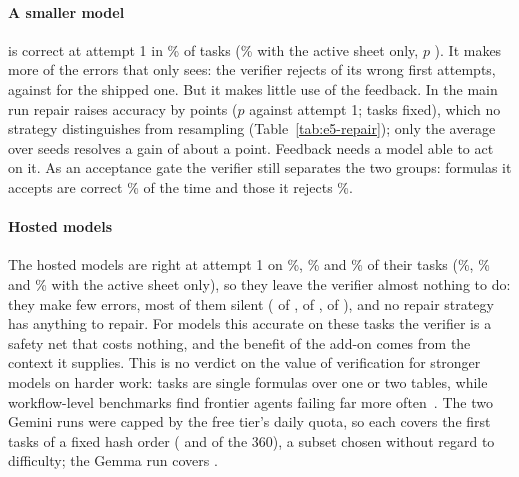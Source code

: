 \paragraph{A smaller model}
\efBName{} is correct at attempt 1 in \efBfinal\% of tasks (\efBflat\% with the active sheet only, $p$ \efBTestfinalvsflatP). It makes more of the errors that only \gc{} sees: the verifier rejects \efBCaughtTwo{} of its \efBWrong{} wrong first attempts, against \efBCaughtOne{} for the shipped one. But it makes little use of the feedback. In the main run repair raises accuracy by \efBSvtwofbD{} points ($p$ \efBSvtwofbP{} against attempt 1; \efBSvtwofbFixed{} tasks fixed), which no strategy distinguishes from resampling (Table~\ref{tab:e5-repair}); only the average over seeds resolves a gain of about a point. Feedback needs a model able to act on it. As an acceptance gate the verifier still separates the two groups: formulas it accepts are correct \efBGateAcc\% of the time and those it rejects \efBGateRej\%.
\fi
\paragraph{Hosted models}
The hosted models are right at attempt 1 on \efDfinal\%, \efEfinal\% and \efFfinal\% of their tasks (\efDflat\%, \efEflat\% and \efFflat\% with the active sheet only), so they leave the verifier almost nothing to do: they make few errors, most of them silent (\efDSilent{} of \efDWrong, \efESilent{} of \efEWrong, \efFSilent{} of \efFWrong), and no repair strategy has anything to repair. For models this accurate on these tasks the verifier is a safety net that costs nothing, and the benefit of the add-on comes from the context it supplies. This is no verdict on the value of verification for stronger models on harder work: \sheetfault{} tasks are single formulas over one or two tables, while workflow-level benchmarks find frontier agents failing far more often~\cite{zhu2026spreadsheetbench2}. The two Gemini runs were capped by the free tier's daily quota, so each covers the first tasks of a fixed hash order (\efDN{} and \efEN{} of the 360), a subset chosen without regard to difficulty; the Gemma run covers \efFN{}.
